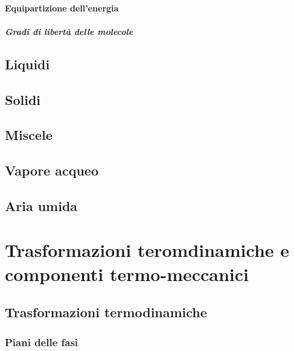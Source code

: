 \subsubsection{Equipartizione dell'energia}

\paragraph{Gradi di libertà delle molecole}


\section{Liquidi}
\section{Solidi}
\section{Miscele}
\section{Vapore acqueo}
\section{Aria umida}

\chapter{Trasformazioni teromdinamiche e componenti termo-meccanici}\label{thermodynamics:thermal_machines}
\section{Trasformazioni termodinamiche}
\subsection{Piani delle fasi}
\begin{definition}
\end{definition}
\begin{definition}[Piano $T-S$]
\end{definition}
\begin{definition}
\end{definition}

